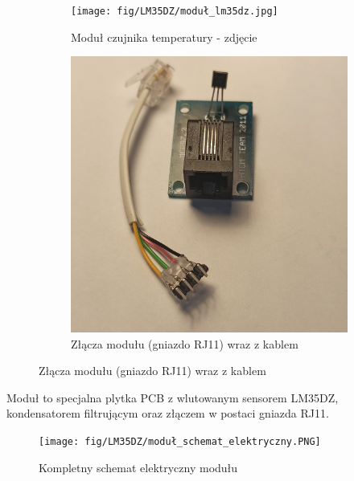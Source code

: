 \documentclass[11pt, a4paper]{article}
\begin{document}
\vspace{0.25cm}
\vspace{0.75cm}
\begin{figure}[h]
\centering
\begin{subfigure}{.5\textwidth}
\centering
\texttt{[image: fig/LM35DZ/moduł\_lm35dz.jpg]}
\caption{Moduł czujnika temperatury - zdjęcie}
\label{fig:_zdjecie_modulu}
\end{subfigure}%
\begin{subfigure}{.5\textwidth}
\centering
\includegraphics[width=.7\linewidth]{fig/LM35DZ/modul.jpg}
\caption{Złącza modułu (gniazdo RJ11) wraz z kablem}
\label{fig:_schemat_modulu}
\end{subfigure}
\label{fig:modul}
\end{figure}
\vspace{0.5cm}

\vspace{0.5cm}
Moduł to specjalna plytka PCB z wlutowanym sensorem LM35DZ, kondensatorem filtrującym oraz złączem w postaci gniazda RJ11.
\newpage
\begin{figure}[h]
    \centering
    \texttt{[image: fig/LM35DZ/moduł\_schemat\_elektryczny.PNG]}
    \caption{Kompletny schemat elektryczny modułu}
    \label{fig:polaczenie_ukladu}
\end{figure}
\newpage
\end{document}
